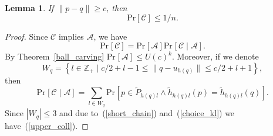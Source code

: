 \documentclass[11pt,letterpaper]{article}
\newtheorem{lemma}[theorem]{Lemma}
\newcommand{\set}[1]{\left\{#1\right\}}
\newcommand{\Prb}[2]{\mathrm{Pr}_{#1}\left[#2\right]}
\newcommand{\Zbb}{\mathbb{Z}}
\newcommand{\Ac}{\mathcal{A}}
\newcommand{\Cc}{\mathcal{C}}
\begin{document}
\begin{lemma}
    \label{upper_coll_lemma}
    If $\|p - q\| \geq c$, then
    \begin{equation}
        \label{upper_coll}
        \mathrm{Pr}[\mathcal{C}] \leq 1 / n.
    \end{equation}
\end{lemma}
\begin{proof}
    Since $\Cc$ implies $\Ac$, we have
    \begin{equation}
        \label{short_chain}
        \Prb{}{\Cc} = \Prb{}{\Ac} \Prb{}{\Cc \mid \Ac}.
    \end{equation}
    By Theorem~\ref{ball_carving} $\Prb{}{\Ac} \leq U(c)^k$.
    Moreover, if we denote $$W_q = \set{l \in \Zbb_+ \mid c / 2 + l - 1 \leq \|q - u_{h(q)} \| \leq c / 2 + l + 1},$$ then
    $$
        \Prb{}{\Cc \mid \Ac} = \sum_{l \in W_q} \Prb{}{p \in \widetilde{P}_{h(q) l} \wedge \widetilde{h}_{h(q) l}(p) = \widetilde{h}_{h(q) l}(q)}.
    $$
    Since $|W_q| \leq 3$ and due to~(\ref{short_chain}) and~(\ref{choice_kl}) we have~(\ref{upper_coll}).
\end{proof}
\end{document}
